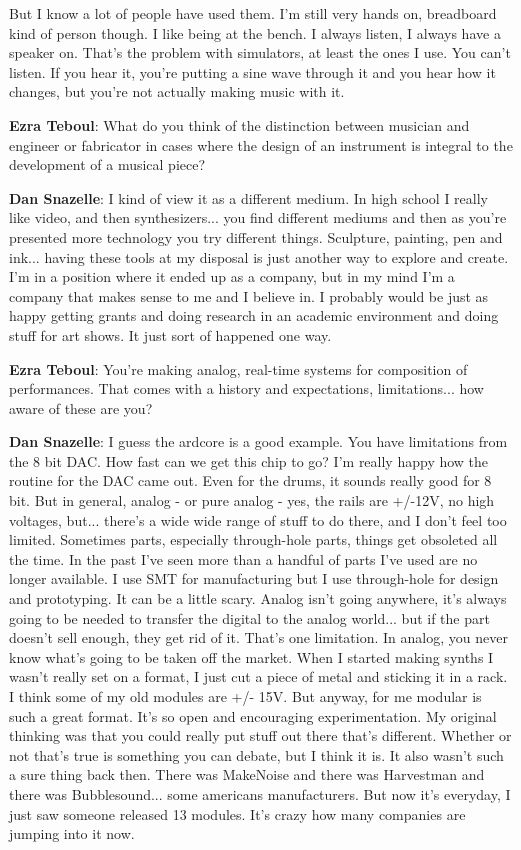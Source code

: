 But I know a lot of people have used them. I'm still very hands on, breadboard kind of person though. I like being at the bench. I always listen, I always have a speaker on. That's the problem with simulators, at least the ones I use. You can't listen. If you hear it, you're putting a sine wave through it and you hear how it changes, but you're not actually making music with it. 

\textbf{Ezra Teboul}: What do you think of the distinction between musician and engineer or fabricator in cases where the design of an instrument is integral to the development of a musical piece? 

\textbf{Dan Snazelle}: I kind of view it as a different medium. In high school I really like video, and then synthesizers... you find different mediums and then as you're presented more technology you try different things. Sculpture, painting, pen and ink... having these tools at my disposal is just another way to explore and create. I'm in a position where it ended up as a company, but in my mind I'm a company that makes sense to me and I believe in. I probably would be just as happy getting grants and doing research in an academic environment and doing stuff for art shows. It just sort of happened one way. 

\textbf{Ezra Teboul}: You're making analog, real-time systems for composition of performances. That comes with a history and expectations, limitations... how aware of these are you? 

\textbf{Dan Snazelle}: I guess the ardcore is a good example. You have limitations from the 8 bit DAC. How fast can we get this chip to go? I'm really happy how the routine for the DAC came out. Even for the drums, it sounds really good for 8 bit. But in general, analog - or pure analog - yes, the rails are +/-12V, no high voltages, but... there's a wide wide range of stuff to do there, and I don't feel too limited. Sometimes parts, especially through-hole parts, things get obsoleted all the time. In the past I've seen more than a handful of parts I've used are no longer available. I use SMT for manufacturing but I use through-hole for design and prototyping. It can be a little scary. Analog isn't going anywhere, it's always going to be needed to transfer the digital to the analog world... but if the part doesn't sell enough, they get rid of it. That's one limitation. In analog, you never know what's going to be taken off the market. When I started making synths I wasn't really set on a format, I just cut a piece of metal and sticking it in a rack. I think some of my old modules are +/- 15V. But anyway, for me modular is such a great format. It's so open and encouraging experimentation. My original thinking was that you could really put stuff out there that's different. Whether or not that's true is something you can debate, but I think it is. It also wasn't such a sure thing back then. There was MakeNoise and there was Harvestman and there was Bubblesound... some americans manufacturers. But now it's everyday, I just saw someone released 13 modules. It's crazy how many companies are jumping into it now. 

